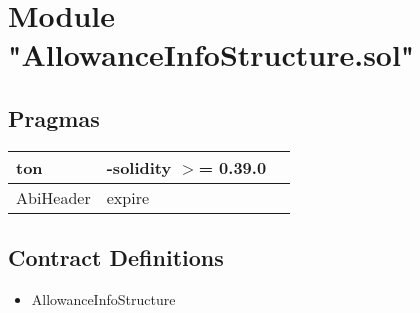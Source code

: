 
\section{Module "AllowanceInfoStructure.sol"}


\subsection{Pragmas}


\noindent\begin{tabular}{|l|l|p{5cm}|}\hline
ton & -solidity $>$= 0.39.0 &\\\hline
AbiHeader &  expire &\\\hline
\end{tabular}


\subsection{Contract Definitions}

\begin{itemize}
\item AllowanceInfoStructure
\end{itemize}
